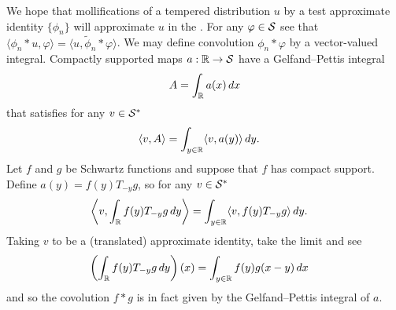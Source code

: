     We hope that mollifications of a tempered distribution $u$ by a test approximate identity $\{\phi_n\}$ will approximate $u$ in the \ws.
    For any $\varphi\in\S$ see that $\langle\phi_n*u,\varphi\rangle = \langle u, \tilde\phi_n*\varphi\rangle$.
    We may define convolution $\phi_n*\varphi$ by a vector-valued integral.
    Compactly supported  maps $a:\R\rightarrow\S$ have a Gelfand--Pettis integral 
    \begin{align*}
      A = \int_\R a(x)\,dx
    \end{align*}
    that satisfies for any $v\in\SS$
    \begin{align*}
      \langle v, A\rangle
      &= \int_{y\in\R} \langle v, a(y)\rangle\,dy \text{.}
    \end{align*}
    Let $f$ and $g$ be Schwartz functions and suppose that $f$ has compact support.
    Define $a(y)=f(y)T_{-y}g$, so for any $v\in\SS$
    \begin{align*}
      \left\langle v, \int_{\R} f(y)T_{-y}g\,dy \right\rangle
      &= \int_{y\in\R} \langle v, f(y)T_{-y}g\rangle\, dy \text{.}
    \end{align*}
    Taking $v$ to be a (translated) approximate identity, take the limit and see
    \begin{align*}
      \left( \int_{\R} f(y)T_{-y}g\,dy \right)(x)
      &= \int_{y\in\R} f(y)g(x-y)\,dx
    \end{align*}
    and so the covolution $f*g$ is in fact given by the Gelfand--Pettis integral of $a$.
    
